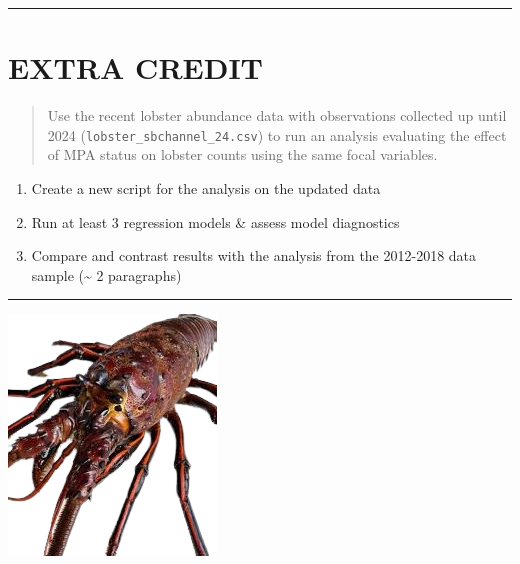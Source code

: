 \documentclass[
]{article}
\providecommand{\tightlist}{%
  \setlength{\itemsep}{0pt}\setlength{\parskip}{0pt}}
\begin{document}
\begin{center}\rule{0.5\linewidth}{0.5pt}\end{center}

\section{EXTRA CREDIT}\label{extra-credit}

\begin{quote}
Use the recent lobster abundance data with observations collected up
until 2024 (\texttt{lobster\_sbchannel\_24.csv}) to run an analysis
evaluating the effect of MPA status on lobster counts using the same
focal variables.
\end{quote}

\begin{enumerate}
\def\labelenumi{\alph{enumi}.}
\tightlist
\item
  Create a new script for the analysis on the updated data
\item
  Run at least 3 regression models \& assess model diagnostics
\item
  Compare and contrast results with the analysis from the 2012-2018 data
  sample (\textasciitilde{} 2 paragraphs)
\end{enumerate}

\begin{center}\rule{0.5\linewidth}{0.5pt}\end{center}

\includegraphics{figures/spiny1.png}
\end{document}
